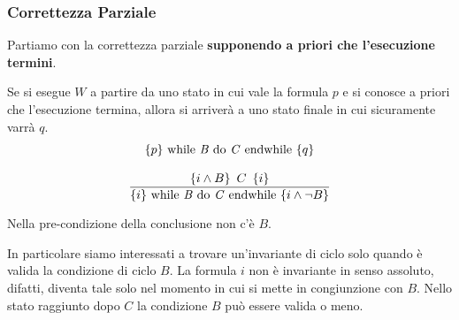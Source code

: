 			\subsubsection{Correttezza Parziale}
			Partiamo con la correttezza parziale \textbf{supponendo a priori che l'esecuzione
			termini}. 
			\begin{definizione}
			    Se si esegue $W$ a partire da uno stato in cui vale la formula $p$ e si conosce a priori che l'esecuzione termina, allora si arriverà a uno stato finale in cui sicuramente varrà $q$.
			   	\[\{p\}\mbox{ while \textit{B} do \textit{C} endwhile }\{q\}\]
			 \end{definizione}
			 \begin{definizione}
			 			\begin{align}\label{IterationRulePartial}
				\frac{\{i\land B\}\,\,\, C\,\,\,\{i\}}{\{i\}\mbox{ while \textit{B} do 
				\textit{C} endwhile }\{i\land \neg B\}}                               
			\end{align}

						\begin{nota}
			Nella pre-condizione della conclusione non c'è $B$.
			\end{nota}
			\end{definizione}
			
			In particolare siamo interessati a trovare un'invariante di ciclo solo quando è valida la condizione di ciclo $B$. La formula $i$ non è invariante in senso assoluto, difatti, diventa tale solo nel momento in cui si mette in congiunzione con $B$. Nello stato raggiunto
			dopo $C$ la condizione $B$ può essere valida o meno. 
			
